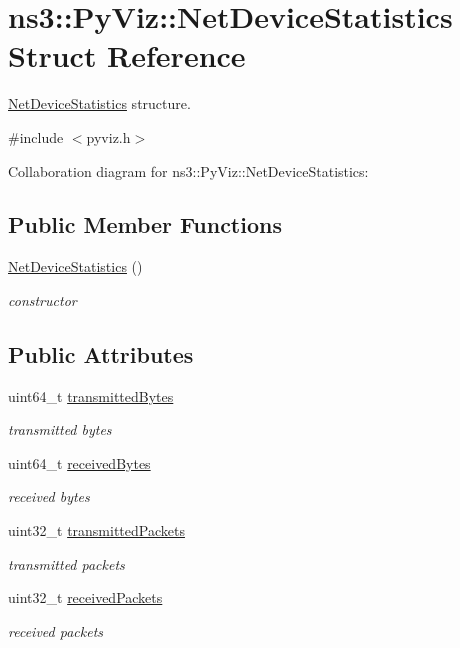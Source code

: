 \hypertarget{structns3_1_1PyViz_1_1NetDeviceStatistics}{}\section{ns3\+:\+:Py\+Viz\+:\+:Net\+Device\+Statistics Struct Reference}
\label{structns3_1_1PyViz_1_1NetDeviceStatistics}


\hyperlink{structns3_1_1PyViz_1_1NetDeviceStatistics}{Net\+Device\+Statistics} structure.  




{\ttfamily \#include $<$pyviz.\+h$>$}



Collaboration diagram for ns3\+:\+:Py\+Viz\+:\+:Net\+Device\+Statistics\+:
\subsection*{Public Member Functions}
\begin{DoxyCompactItemize}
\item 
\hyperlink{structns3_1_1PyViz_1_1NetDeviceStatistics_a8a204ccd0abd93b7e75d48587586097f}{Net\+Device\+Statistics} ()
\begin{DoxyCompactList}\small\item\em constructor \end{DoxyCompactList}\end{DoxyCompactItemize}
\subsection*{Public Attributes}
\begin{DoxyCompactItemize}
\item 
uint64\+\_\+t \hyperlink{structns3_1_1PyViz_1_1NetDeviceStatistics_a4f07fcaed9413426b5b6354fb73d6a8c}{transmitted\+Bytes}
\begin{DoxyCompactList}\small\item\em transmitted bytes \end{DoxyCompactList}\item 
uint64\+\_\+t \hyperlink{structns3_1_1PyViz_1_1NetDeviceStatistics_a3d5304d6429727a1023e3835400c04f8}{received\+Bytes}
\begin{DoxyCompactList}\small\item\em received bytes \end{DoxyCompactList}\item 
uint32\+\_\+t \hyperlink{structns3_1_1PyViz_1_1NetDeviceStatistics_abf697ec59ef822d3a90805f757dd1cf1}{transmitted\+Packets}
\begin{DoxyCompactList}\small\item\em transmitted packets \end{DoxyCompactList}\item 
uint32\+\_\+t \hyperlink{structns3_1_1PyViz_1_1NetDeviceStatistics_a511e8676815e5f02ff8d1f67b8617e5c}{received\+Packets}
\begin{DoxyCompactList}\small\item\em received packets \end{DoxyCompactList}\end{DoxyCompactItemize}


